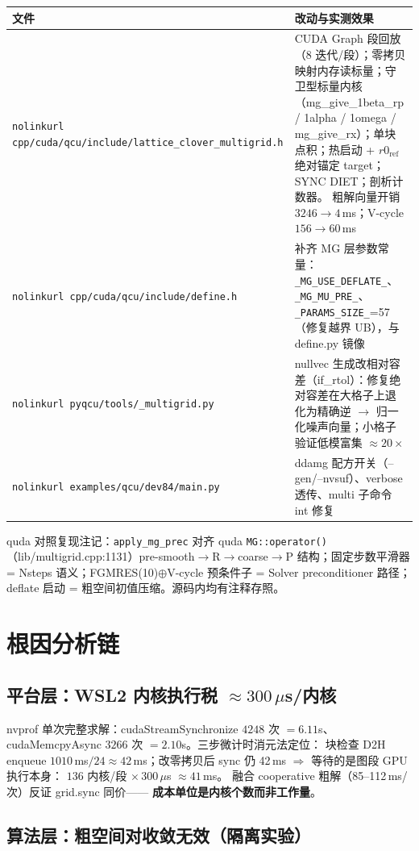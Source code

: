 \documentclass[UTF8]{ctexart}
\begin{document}
\begin{xltabular}{\linewidth}{@{}lX@{}}
\toprule
文件 & 改动与实测效果 \\
\midrule
\texttt{nolinkurl cpp/cuda/qcu/include/lattice\_clover\_multigrid.h} &
CUDA Graph 段回放（8 迭代/段）；零拷贝映射内存读标量；守卫型标量内核
（mg\_give\_1beta\_rp / 1alpha / 1omega / mg\_give\_rx）；单块点积；热启动 +
$r0_{\text{ref}}$ 绝对锚定 target；SYNC DIET；剖析计数器。
粗解向量开销 $3246\to4$\,ms；V-cycle $156\to60$\,ms \\
\texttt{nolinkurl cpp/cuda/qcu/include/define.h} &
补齐 MG 层参数常量：\texttt{\_MG\_USE\_}\texttt{DEFLATE\_}、\texttt{\_MG\_MU\_PRE\_}、\texttt{\_PARAMS\_SIZE\_}=57
（修复越界 UB），与 define.py 镜像 \\
\texttt{nolinkurl pyqcu/tools/\_multigrid.py} &
nullvec 生成改相对容差（if\_rtol）：修复绝对容差在大格子上退化为精确逆
$\to$ 归一化噪声向量；小格子验证低模富集 $\approx20\times$ \\
\texttt{nolinkurl examples/qcu/dev84/main.py} &
ddamg 配方开关（--gen/--nvsuf）、verbose 透传、multi 子命令 int 修复 \\
\bottomrule
\end{xltabular}

quda 对照复现注记：\texttt{apply\_mg\_prec} 对齐 quda \texttt{MG::operator()}
（lib/multigrid.cpp:1131）pre-smooth$\to$R$\to$coarse$\to$P 结构；固定步数平滑器 =
Nsteps 语义；FGMRES(10)$\oplus$V-cycle 预条件子 = Solver preconditioner 路径；
deflate 启动 = 粗空间初值压缩。源码内均有注释存照。

\section{根因分析链}

\subsection{平台层：WSL2 内核执行税 $\approx300\,\mu$s/内核}

nvprof 单次完整求解：cudaStreamSynchronize $4248$ 次 $=6.11$s、
cudaMemcpyAsync $3266$ 次 $=2.10$s。三步微计时消元法定位：
块检查 D2H enqueue $1010$\,ms$/24\approx42$\,ms；改零拷贝后 sync 仍 42\,ms
$\Rightarrow$ 等待的是图段 GPU 执行本身：
$136$ 内核/段 $\times\,300\,\mu$s $\approx41$\,ms。
融合 cooperative 粗解（85--112\,ms/次）反证 grid.sync 同价——
\textbf{成本单位是内核个数而非工作量}。

\subsection{算法层：粗空间对收敛无效（隔离实验）}
\end{document}
